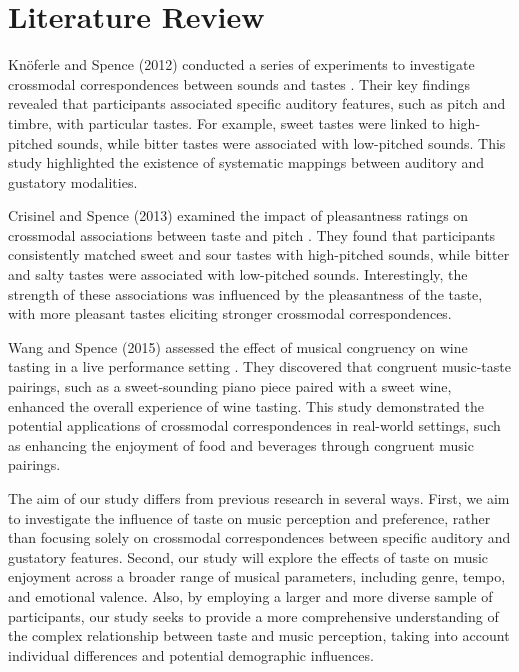 \documentclass[conference]{IEEEtran}
\begin{document}
\section{Literature Review}
Knöferle and Spence (2012) conducted a series of experiments to investigate crossmodal correspondences between sounds and tastes \cite{b8}. Their key findings revealed that participants associated specific auditory features, such as pitch and timbre, with particular tastes. For example, sweet tastes were linked to high-pitched sounds, while bitter tastes were associated with low-pitched sounds. This study highlighted the existence of systematic mappings between auditory and gustatory modalities.

Crisinel and Spence (2013) examined the impact of pleasantness ratings on crossmodal associations between taste and pitch \cite{b9}. They found that participants consistently matched sweet and sour tastes with high-pitched sounds, while bitter and salty tastes were associated with low-pitched sounds. Interestingly, the strength of these associations was influenced by the pleasantness of the taste, with more pleasant tastes eliciting stronger crossmodal correspondences.

Wang and Spence (2015) assessed the effect of musical congruency on wine tasting in a live performance setting \cite{b10}. They discovered that congruent music-taste pairings, such as a sweet-sounding piano piece paired with a sweet wine, enhanced the overall experience of wine tasting. This study demonstrated the potential applications of crossmodal correspondences in real-world settings, such as enhancing the enjoyment of food and beverages through congruent music pairings.

The aim of our study differs from previous research in several ways. First, we aim to investigate the influence of taste on music perception and preference, rather than focusing solely on crossmodal correspondences between specific auditory and gustatory features. Second, our study will explore the effects of taste on music enjoyment across a broader range of musical parameters, including genre, tempo, and emotional valence. Also, by employing a larger and more diverse sample of participants, our study seeks to provide a more comprehensive understanding of the complex relationship between taste and music perception, taking into account individual differences and potential demographic influences.
\end{document}
